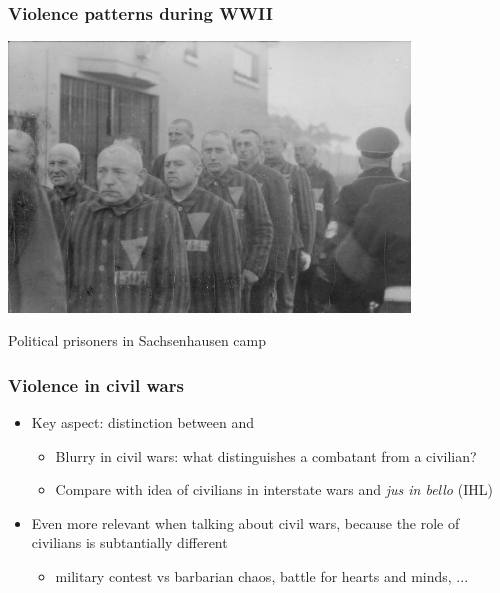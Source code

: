 \documentclass[aspectratio=43]{beamer}
\begin{document}
\begin{frame}
\frametitle{Violence patterns during WWII}
\centering

\includegraphics[width = 0.8\textwidth]{img/wwii-Sachsenhausen}

Political prisoners in Sachsenhausen camp

\end{frame}


\begin{frame}
\frametitle{Violence in civil wars}
\centering

\begin{itemize}
  \item<1-> Key aspect: distinction between  and 
  \begin{itemize}
    \item Blurry in civil wars: what distinguishes a combatant from a civilian?
    \item Compare with idea of civilians in interstate wars and \textit{jus in bello} (IHL)
  \end{itemize}
  \item<2-> Even more relevant when talking about civil wars, because the role of civilians is subtantially different
  \begin{itemize}
    \item<3-> military contest vs barbarian chaos, battle for hearts and minds, ...
  \end{itemize}

\end{itemize}

\end{frame}
\end{document}
